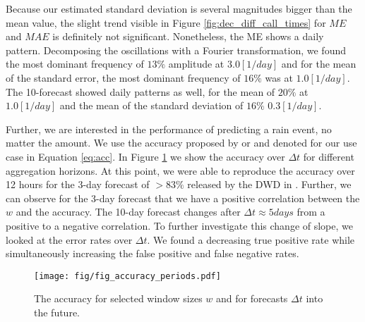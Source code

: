 \documentclass{article}
\theoremstyle{plain}
\theoremstyle{definition}
\theoremstyle{remark}
\begin{document}
Because our estimated standard deviation is several magnitudes bigger than the
mean value, the slight trend visible in Figure \ref{fig:dec_diff_call_times}
for $ME$ and $MAE$ is definitely not significant. Nonetheless, the ME shows a
daily pattern. Decomposing the oscillations with a Fourier transformation, we
found the most dominant frequency of $13\%$ amplitude at $3.0 [1/day]$
and for the mean of the standard error, the most dominant frequency of $16\%$
was at $1.0 [1/day]$. The 10-forecast showed daily patterns as well, for the
mean of $20\%$ at $1.0 [1/day]$ and the mean of the standard deviation of
$16\%$ $0.3 [1/day]$.

Further, we are interested in the performance of predicting a rain event, no
matter the amount. We use the accuracy proposed by \cite{Forecast_quaility_DWD}
or \cite{ECMWF_DL_acc_improvement} and denoted for our use case in Equation
\ref{eq:acc}. In Figure \ref{fig:accuracy} we show the accuracy over $\Delta t$
for different aggregation horizons. At this point, we were able to reproduce
the accuracy over 12 hours for the 3-day forecast of $> 83 \%$ released by the
DWD in \cite{Forecast_quaility_DWD}. Further, we can observe for the 3-day
forecast that we have a positive correlation between the $w$ and the accuracy.
The 10-day forecast changes after $\Delta t\approx 5 days$ from a positive to a
negative correlation. To further investigate this change of slope, we looked at
the error rates over $\Delta t$. We found a decreasing true positive rate while
simultaneously increasing the false positive and false negative rates.

\begin{figure}
    \centering
    \texttt{[image: fig/fig\_accuracy\_periods.pdf]}
    \caption{The accuracy for selected window sizes $w$ and for forecasts
        $\Delta t$ into the future.}
    \label{fig:accuracy}
\end{figure}
\end{document}
